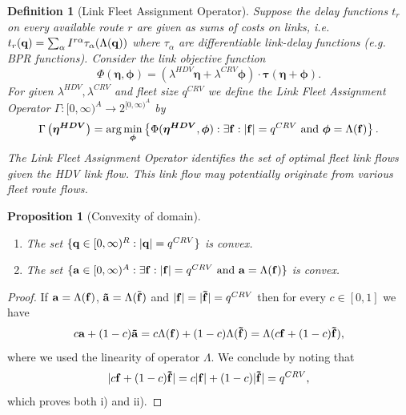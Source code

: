 \documentclass[a4paper,11pt]{article}
\newtheorem{proposition}[theorem]{Proposition}
\newtheorem{definition}[theorem]{Definition}
\begin{document}
\begin{definition}[Link Fleet Assignment Operator]
\label{def_linkassignoper}
Suppose the delay functions $t_r$ on every available route $r$ are given as sums of costs on links, i.e. $t_r(\bold{q}) = \sum_{\alpha} I^{r\alpha} \tau_\alpha(\Lambda(\bold{q}))$ where $\tau_\alpha$ are differentiable link-delay functions (e.g. BPR functions). Consider the link objective function
\begin{equation*}
\Phi(\boldsymbol{\eta}, \boldsymbol{\phi}) = (\lambda^{HDV}\boldsymbol{\eta} + \lambda^{CRV}\boldsymbol{\phi})\cdot \boldsymbol{\tau}(\boldsymbol{\eta} + \boldsymbol{\phi}).
\end{equation*}
For given $\lambda^{HDV}, \lambda^{CRV}$ and fleet size $q^{CRV}$ we define the \emph{Link Fleet Assignment Operator} $\Gamma: [0,\infty)^A \to 2^{[0,\infty)^A}$ by
\begin{equation*}
\Gamma \left(\boldsymbol{\eta^{HDV}}\right) = \arg \min_{\boldsymbol{\phi}} \left\{\Phi(\boldsymbol{\eta^{HDV}},\boldsymbol{\phi}): \exists \bold{f}: |\bold{f}| = q^{CRV} \mbox{ and } \boldsymbol{\phi} = \Lambda(\bold{f})\right\}.
\end{equation*} 
The Link Fleet Assignment Operator identifies the set of optimal fleet link flows given the HDV link flow. This link flow may potentially originate from various fleet route flows. 
\end{definition}

\begin{proposition}[Convexity of domain]
\label{Prop_convexity}
\,

\begin{enumerate}
\item[i)] The set $\{\bold{q} \in [0,\infty)^R:  |\bold{q}| = q^{CRV}\}$ is convex.
\item[ii)] The set $\{\bold{a} \in [0,\infty)^A: \exists \bold{f}: |\bold{f}| = q^{CRV} \mbox{ and } \bold{a} = \Lambda(\bold{f})\}$ is convex.
\end{enumerate}
\end{proposition}
\begin{proof}
If $\bold{a} = \Lambda(\bold{f})$, $\bold{\tilde{a}} = \Lambda(\tilde{\bold{f}})$ and $|\bold{f}| = |\bold{\tilde{f}}| = q^{CRV}$ then for every $c \in [0,1]$ we have $$c\bold{a}+(1-c)\bold{\tilde{a}} = c\Lambda(\bold{f}) + (1-c)\Lambda(\bold{\tilde{f}}) = \Lambda(c \bold{f} + (1-c) \bold{\tilde{f}}),$$ where we used the linearity of operator $\Lambda$. We conclude by noting that $$|c \bold{f} + (1-c) \bold{\tilde{f}}| = c|\bold{f}| + (1-c)|\bold{\tilde{f}}| = q^{CRV},$$ which proves both i) and ii).  
\end{proof}
\end{document}
